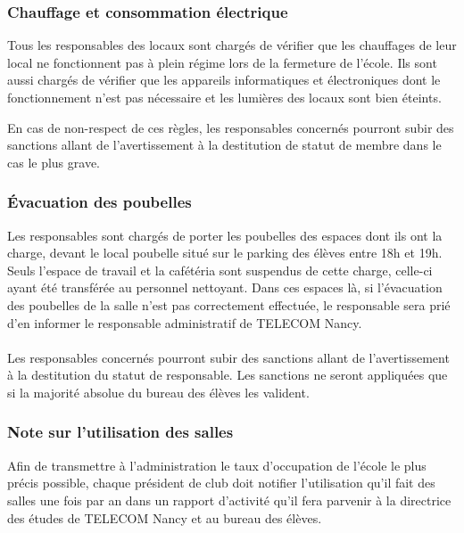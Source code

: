\documentclass{article} %
\begin{document}
			\subsubsection{Chauffage et consommation électrique}
\label{ssub:chauffage_et_consommation_electrique}

				Tous les responsables des locaux sont chargés de vérifier que
				les chauffages de leur local ne fonctionnent pas à plein régime
				lors de la fermeture de l’école. Ils sont aussi chargés de
				vérifier que les appareils informatiques et électroniques dont
				le fonctionnement n’est pas nécessaire et les lumières des
				locaux sont bien éteints.

				En cas de non-respect de ces règles, les responsables concernés
				pourront subir des sanctions allant de l’avertissement à la
				destitution de statut de membre dans le cas le plus grave.

			\subsubsection{Évacuation des poubelles}
\label{ssub:evacuation_des_poubelles}

				Les responsables sont chargés de porter les poubelles des
				espaces dont ils ont la charge, devant le local poubelle situé
				sur le parking des élèves entre 18h et 19h. Seuls l’espace de travail et la
				cafétéria sont suspendus de cette charge, celle-ci ayant été
				transférée au personnel nettoyant. Dans ces espaces là, si
				l’évacuation des poubelles de la salle n’est pas correctement
				effectuée, le responsable sera prié d’en informer le responsable
				administratif de TELECOM Nancy.

                \paragraph{}
				Les responsables concernés pourront subir des sanctions allant
				de l’avertissement à la destitution du statut de responsable.
				Les sanctions ne seront appliquées que si la majorité absolue du
				bureau des élèves les valident.

			\subsubsection{Note sur l'utilisation des salles}
\label{ssub:note_sur_l_utilisation_des_salles}

				Afin de transmettre à l’administration le taux d’occupation de
				l’école le plus précis possible, chaque président de club doit
				notifier l’utilisation qu’il fait des salles une fois par an
				dans un rapport d'activité qu'il fera parvenir à la directrice
				des études de TELECOM Nancy et au bureau des élèves.
\end{document}
